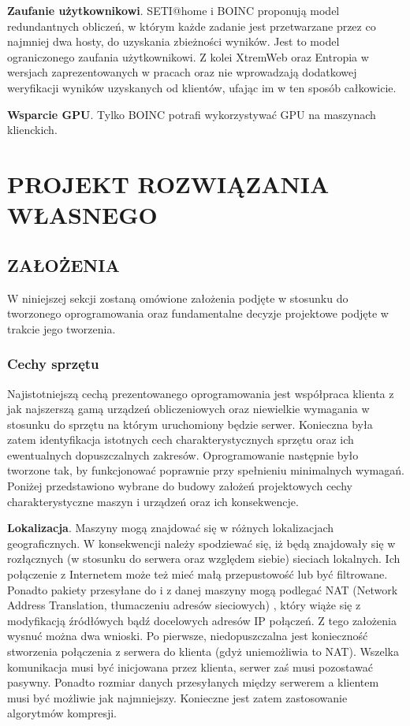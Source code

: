 \documentclass[12pt,a4paper,twoside]{article}
\begin{document}
\textbf{Zaufanie użytkownikowi}. SETI@home i BOINC proponują model redundantnych obliczeń, w którym każde zadanie jest przetwarzane przez co najmniej dwa hosty, do uzyskania zbieżności wyników. Jest to model ograniczonego zaufania użytkownikowi. Z kolei XtremWeb oraz Entropia w wersjach zaprezentowanych w pracach \cite{entropia} oraz \cite{xtremweb} nie wprowadzają dodatkowej weryfikacji wyników uzyskanych od klientów, ufając im w ten sposób całkowicie.

\textbf{Wsparcie GPU}. Tylko BOINC potrafi wykorzystywać GPU na maszynach klienckich.

\section{PROJEKT ROZWIĄZANIA WŁASNEGO}

\subsection{ZAŁOŻENIA}

W niniejszej sekcji zostaną omówione założenia podjęte w stosunku do tworzonego oprogramowania oraz fundamentalne decyzje projektowe podjęte w trakcie jego tworzenia.

\subsubsection{Cechy sprzętu}

Najistotniejszą cechą prezentowanego oprogramowania jest współpraca klienta z jak najszerszą gamą urządzeń obliczeniowych oraz niewielkie wymagania w stosunku do sprzętu na którym uruchomiony będzie serwer. Konieczna była zatem identyfikacja istotnych cech charakterystycznych sprzętu oraz ich ewentualnych dopuszczalnych zakresów. Oprogramowanie następnie było tworzone tak, by funkcjonować poprawnie przy spełnieniu minimalnych wymagań. Poniżej przedstawiono wybrane do budowy założeń projektowych cechy charakterystyczne maszyn i urządzeń oraz ich konsekwencje.

\textbf{Lokalizacja}. Maszyny mogą znajdować się w różnych lokalizacjach geograficznych. W konsekwencji należy spodziewać się, iż będą znajdowały się w rozłącznych (w stosunku do serwera oraz względem siebie) sieciach lokalnych. Ich połączenie z Internetem może też mieć małą przepustowość lub być filtrowane. Ponadto pakiety przesyłane do i z danej maszyny mogą podlegać NAT (Network Address Translation, tłumaczeniu adresów sieciowych) \cite{nat}, który wiąże się z modyfikacją źródłówych bądź docelowych adresów IP połączeń. Z tego założenia wysnuć można dwa wnioski. Po pierwsze, niedopuszczalna jest konieczność stworzenia połączenia z serwera do klienta (gdyż uniemożliwia to NAT). Wszelka komunikacja musi być inicjowana przez klienta, serwer zaś musi pozostawać pasywny. Ponadto rozmiar danych przesyłanych między serwerem a klientem musi być możliwie jak najmniejszy. Konieczne jest zatem zastosowanie algorytmów kompresji.
\end{document}
